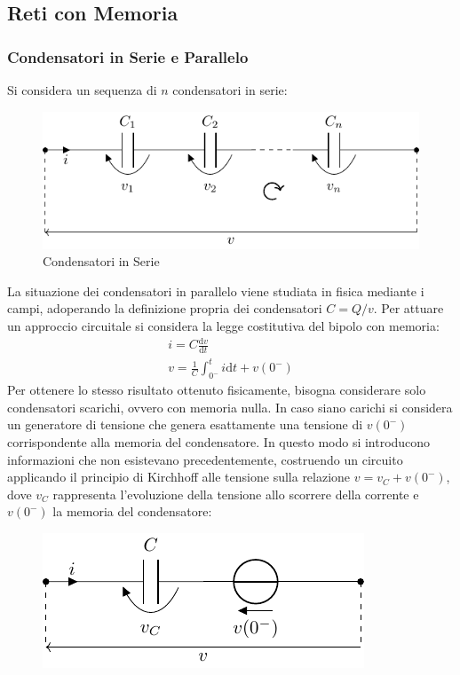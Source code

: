 \documentclass{article}
\newcommand{\df}{\mathrm{d}}
\numberwithin{equation}{subsection}
\begin{document}
\subsection{Reti con Memoria}

\subsubsection{Condensatori in Serie e Parallelo}

Si considera un sequenza di $n$ condensatori in serie:

\begin{figure}[H]%
    \centering
    \includegraphics{condensatore-serie.pdf}%
    \caption{Condensatori in Serie}%
    \label{fig:condensatore-serie}
\end{figure}

La situazione dei condensatori in parallelo viene studiata in fisica mediante i campi, adoperando la definizione propria dei condensatori $C=Q/v$. Per attuare un approccio 
circuitale si considera la legge costitutiva del bipolo con memoria:
\begin{gather*}
    i=C\displaystyle\frac{\df v}{\df t}\\
    v=\displaystyle\frac{1}{C}\int_{0^-}^ti\df t+v(0^-)
\end{gather*}
Per ottenere lo stesso risultato ottenuto fisicamente, bisogna considerare solo condensatori scarichi, ovvero con memoria nulla. In caso siano carichi si considera un 
generatore di tensione che genera esattamente una tensione di $v(0^-)$ corrispondente alla memoria del condensatore. In questo modo si introducono informazioni che non 
esistevano precedentemente, costruendo un circuito applicando il principio di Kirchhoff alle tensione sulla relazione $v=v_C+v(0^-)$, dove $v_C$ rappresenta l'evoluzione 
della tensione allo scorrere della corrente e $v(0^-)$ la memoria del condensatore:

\begin{figure}[H]%
    \centering
    \includegraphics{condensatore-memoria.pdf}%
    \label{fig:condensatore-memoria}
\end{figure}
\end{document}
